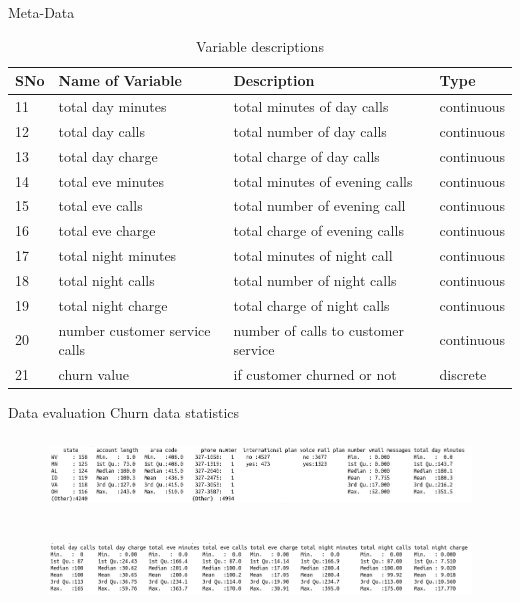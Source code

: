 \documentclass{beamer}
\newcommand\Fontmetadata{\fontsize{8}{7.2}\selectfont}
\begin{document}
\begin{frame}{Meta-Data}
	\Fontmetadata

	\begin{table}[]

		\caption{Variable descriptions}
		\label{var-2}
		\hspace*{-0.5cm}		\begin{tabular}{llll}
			\hline
			SNo & Name of Variable & Description            & Type                \\
			\hline
			11 & total day minutes &  total minutes of day calls  &  continuous   \\
			12 & total day calls & total number of day calls &  continuous   \\
			13 & total day charge & total charge of day calls &  continuous   \\
			14 & total eve minutes & total minutes of evening calls &  continuous   \\
			15 & total eve calls & total number of evening call  &  continuous   \\
			16 & total eve charge & total charge of evening calls  &  continuous   \\
			17 & total night minutes & total minutes of night call &  continuous   \\
			18 & total night calls & total number of night calls &  continuous   \\
			19 & total night charge & total charge of night calls  &  continuous   \\
			20 & number customer service calls & number of calls to customer service &  continuous   \\
			21 & churn value & if customer churned or not & discrete \\
			\hline
		\end{tabular}
	\end{table}
\end{frame}
\begin{frame}{Data evaluation}
	Churn data statistics
	\begin{figure}
		\hspace*{-1cm}\includegraphics[width=13cm,height=2cm]{ppt_figures/data_summary_1}
	\end{figure}
	\begin{figure}
		\hspace*{-1cm}\includegraphics[width=13cm,height=2cm]{ppt_figures/data_summary_2}
	\end{figure}

\end{frame}
\end{document}
